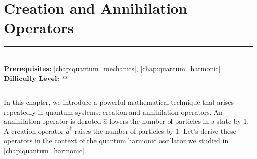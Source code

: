 \documentclass[book.tex]{subfiles}
\begin{document}
\chapter{Creation and Annihilation Operators}

\label{chap:creation_annihilation}
\noindent\rule{11cm}{0.4pt} \\
\textbf{Prerequisites:} \autoref{chap:quantum_mechanics}, \autoref{chap:quantum_harmonic} \\
\textbf{Difficulty Level:} ** \\
\noindent\rule{11cm}{0.4pt}
\vspace{5mm}

In this chapter, we introduce a powerful mathematical technique that arises repeatedly in quantum systems: creation and annihilation operators. An annihilation operator is denoted $\hat{a}$ lowers the number of particles in a state by 1. A creation operator $\hat{a}^{\dagger}$ raises the number of particles by 1. Let's derive these operators in the context of the quantum harmonic oscillator we studied in \autoref{chap:quantum_harmonic}.
\end{document}
